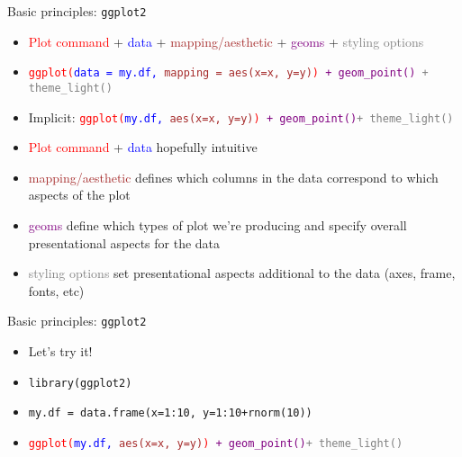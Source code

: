 \documentclass[10pt]{beamer}
\begin{document}
\begin{frame}{Basic principles: \texttt{ggplot2}}
    \begin{itemize}
    \item \textcolor{red}{Plot command} + \textcolor{blue}{data} + \textcolor{brown}{mapping/aesthetic} + \textcolor{purple}{geoms} + \textcolor{gray}{styling options}
    \item \texttt{\textcolor{red}{ggplot(}\textcolor{blue}{data = my.df,} \textcolor{brown}{mapping = aes(x=x, y=y)}\textcolor{red}{)} \textcolor{purple}{+ geom\_point()} \textcolor{gray}{+ theme\_light()}}
    \item Implicit: \texttt{\textcolor{red}{ggplot(}\textcolor{blue}{my.df,} \textcolor{brown}{aes(x=x, y=y)}\textcolor{red}{)} \textcolor{purple}{+ geom\_point()}}\textcolor{gray}{\texttt{+ theme\_light()}}
    \item \textcolor{red}{Plot command} + \textcolor{blue}{data} hopefully intuitive
    \item \textcolor{brown}{mapping/aesthetic} defines which columns in the data correspond to which aspects of the plot
    \item \textcolor{purple}{geoms} define which types of plot we're producing and specify overall presentational aspects for the data
      \item \textcolor{gray}{styling options} set presentational aspects additional to the data (axes, frame, fonts, etc)
        \end{itemize}
\end{frame}

\begin{frame}{Basic principles: \texttt{ggplot2}}
  \begin{itemize}
  \item Let's try it!
    \item[] \texttt{library(ggplot2)}
    \item[] \texttt{my.df = data.frame(x=1:10, y=1:10+rnorm(10))}
    \item[] \texttt{\textcolor{red}{ggplot(}\textcolor{blue}{my.df,} \textcolor{brown}{aes(x=x, y=y)}\textcolor{red}{)} \textcolor{purple}{+ geom\_point()}}\textcolor{gray}{\texttt{+ theme\_light()}}
         \end{itemize}
\end{frame}
\end{document}
